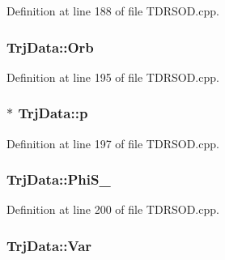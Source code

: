 Definition at line 188 of file T\-D\-R\-S\-O\-D.\-cpp.

\hypertarget{classTrjData_abaee3d46269c1ad0c2d9c91743a35915}{
\subsubsection[{Orb}]{ Trj\-Data\-::\-Orb\hspace{0.3cm}{\ttfamily [private]}}}\label{classTrjData_abaee3d46269c1ad0c2d9c91743a35915}


Definition at line 195 of file T\-D\-R\-S\-O\-D.\-cpp.

\hypertarget{classTrjData_af249df1d9668d3796f594baca0cfca82}{
\subsubsection[{p}]{$\ast$ Trj\-Data\-::p\hspace{0.3cm}{\ttfamily [private]}}}\label{classTrjData_af249df1d9668d3796f594baca0cfca82}


Definition at line 197 of file T\-D\-R\-S\-O\-D.\-cpp.

\hypertarget{classTrjData_a835dd3a657da0ac63bf72d08844f7759}{
\subsubsection[{Phi\-S\-\_\-}]{ Trj\-Data\-::\-Phi\-S\-\_\-\hspace{0.3cm}{\ttfamily [private]}}}\label{classTrjData_a835dd3a657da0ac63bf72d08844f7759}


Definition at line 200 of file T\-D\-R\-S\-O\-D.\-cpp.

\hypertarget{classTrjData_a764f69e7f69595c5b8672f15eabf732f}{
\subsubsection[{Var}]{ Trj\-Data\-::\-Var\hspace{0.3cm}{\ttfamily [private]}}}\label{classTrjData_a764f69e7f69595c5b8672f15eabf732f}


